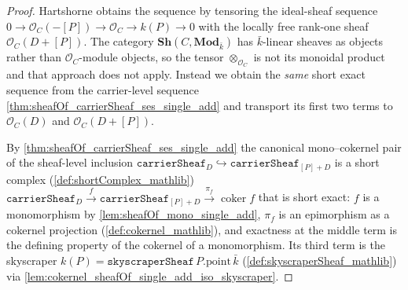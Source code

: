 \begin{proof}
        \leanok
  Hartshorne obtains the sequence by tensoring the ideal-sheaf sequence
  \(0 \to \mathcal O_C(-[P]) \to \mathcal O_C \to k(P) \to 0\) with the
  locally free rank-one sheaf \(\mathcal O_C(D+[P])\). The category
  \(\mathbf{Sh}(C, \mathbf{Mod}_{\bar k})\) has \(\bar k\)-linear sheaves
  as objects rather than \(\mathcal O_C\)-module objects, so the
  tensor \(\otimes_{\mathcal O_C}\) is not its monoidal product and that
  approach does not apply. Instead we obtain the \emph{same} short exact
  sequence from the carrier-level sequence
  \cref{thm:sheafOf_carrierSheaf_ses_single_add} and transport its first two
  terms to \(\mathcal O_C(D)\) and \(\mathcal O_C(D+[P])\).

  By \cref{thm:sheafOf_carrierSheaf_ses_single_add} the canonical mono--cokernel
  pair of the sheaf-level inclusion
  \(\texttt{carrierSheaf}_D \hookrightarrow \texttt{carrierSheaf}_{[P]+D}\) is a
  short complex (\cref{def:shortComplex_mathlib})
  \(\texttt{carrierSheaf}_D \xrightarrow{\ f\ } \texttt{carrierSheaf}_{[P]+D}
  \xrightarrow{\ \pi_f\ } \operatorname{coker} f\) that is short exact: \(f\) is a
  monomorphism by \cref{lem:sheafOf_mono_single_add}, \(\pi_f\) is an
  epimorphism as a cokernel projection (\cref{def:cokernel_mathlib}), and
  exactness at the middle term is the defining property of the cokernel of a
  monomorphism. Its third term is the skyscraper \(k(P) =
  \texttt{skyscraperSheaf}\,P.\mathrm{point}\,\bar k\)
  (\cref{def:skyscraperSheaf_mathlib}) via
  \cref{lem:cokernel_sheafOf_single_add_iso_skyscraper}.


\end{proof}
